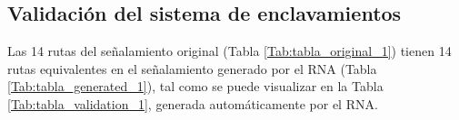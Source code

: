 \subsection{Validación del sistema de enclavamientos}

    Las 14 rutas del señalamiento original (Tabla \ref{Tab:tabla_original_1}) tienen 14 rutas equivalentes en el señalamiento generado por el RNA (Tabla \ref{Tab:tabla_generated_1}), tal como se puede visualizar en la Tabla \ref{Tab:tabla_validation_1}, generada automáticamente por el RNA.

    \begin{table}[H]
        {
        \caption{Equivalencias entre las rutas originales y las generadas por el RNA.}
        \label{Tab:tabla_validation_1}
        \centering
            \begin{center}
            \end{center}
        }    
    \end{table}
    
